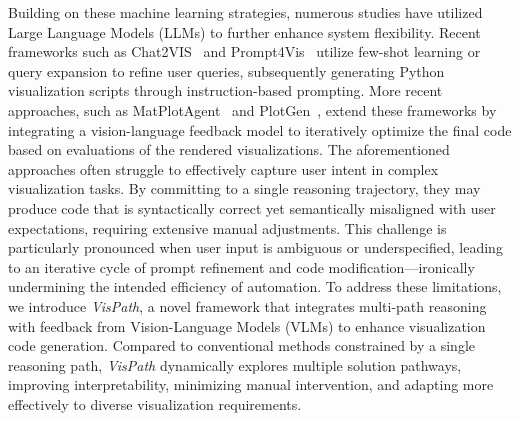 Building on these machine learning strategies, numerous studies have utilized Large Language Models (LLMs) to further enhance system flexibility. Recent frameworks such as Chat2VIS~\cite{maddigan2023Chat2VIS} and Prompt4Vis~\cite{liPrompt4VisPromptingLarge2024} utilize few-shot learning or query expansion to refine user queries, subsequently generating Python visualization scripts through instruction-based prompting. More recent approaches, such as MatPlotAgent~\cite{yang2024matplotagent} and PlotGen~\cite{goswamiPlotGenMultiAgentLLMbased2025}, extend these frameworks by integrating a vision-language feedback model to iteratively optimize the final code based on evaluations of the rendered visualizations. The aforementioned approaches often struggle to effectively capture user intent in complex visualization tasks. By committing to a single reasoning trajectory, they may produce code that is syntactically correct yet semantically misaligned with user expectations, requiring extensive manual adjustments. This challenge is particularly pronounced when user input is ambiguous or underspecified, leading to an iterative cycle of prompt refinement and code modification—ironically undermining the intended efficiency of automation. To address these limitations, we introduce \emph{VisPath}, a novel framework that integrates multi-path reasoning with feedback from Vision-Language Models (VLMs) to enhance visualization code generation. Compared to conventional methods constrained by a single reasoning path, \emph{VisPath} dynamically explores multiple solution pathways, improving interpretability, minimizing manual intervention, and adapting more effectively to diverse visualization requirements.